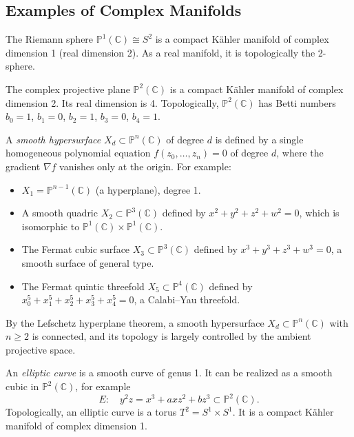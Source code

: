 \subsection{Examples of Complex Manifolds}

\begin{example}
The Riemann sphere $\mathbb{P}^1(\mathbb{C}) \cong S^2$ is a compact K\"{a}hler manifold of complex dimension 1 (real dimension 2). As a real manifold, it is topologically the 2-sphere.
\end{example}

\begin{example}
The complex projective plane $\mathbb{P}^2(\mathbb{C})$ is a compact K\"{a}hler manifold of complex dimension 2. Its real dimension is 4. Topologically, $\mathbb{P}^2(\mathbb{C})$ has Betti numbers $b_0 = 1$, $b_1 = 0$, $b_2 = 1$, $b_3 = 0$, $b_4 = 1$.
\end{example}

\begin{example}
A \emph{smooth hypersurface} $X_d \subset \mathbb{P}^n(\mathbb{C})$ of degree $d$ is defined by a single homogeneous polynomial equation $f(z_0, \ldots, z_n) = 0$ of degree $d$, where the gradient $\nabla f$ vanishes only at the origin. For example:
\begin{itemize}
\item $X_1 = \mathbb{P}^{n-1}(\mathbb{C})$ (a hyperplane), degree 1.
\item A smooth quadric $X_2 \subset \mathbb{P}^3(\mathbb{C})$ defined by $x^2 + y^2 + z^2 + w^2 = 0$, which is isomorphic to $\mathbb{P}^1(\mathbb{C}) \times \mathbb{P}^1(\mathbb{C})$.
\item The Fermat cubic surface $X_3 \subset \mathbb{P}^3(\mathbb{C})$ defined by $x^3 + y^3 + z^3 + w^3 = 0$, a smooth surface of general type.
\item The Fermat quintic threefold $X_5 \subset \mathbb{P}^4(\mathbb{C})$ defined by $x_0^5 + x_1^5 + x_2^5 + x_3^5 + x_4^5 = 0$, a Calabi--Yau threefold.
\end{itemize}
By the Lefschetz hyperplane theorem, a smooth hypersurface $X_d \subset \mathbb{P}^n(\mathbb{C})$ with $n \ge 2$ is connected, and its topology is largely controlled by the ambient projective space.
\end{example}

\begin{example}
An \emph{elliptic curve} is a smooth curve of genus 1. It can be realized as a smooth cubic in $\mathbb{P}^2(\mathbb{C})$, for example
\[
E: \quad y^2 z = x^3 + axz^2 + bz^3 \subset \mathbb{P}^2(\mathbb{C}).
\]
Topologically, an elliptic curve is a torus $T^2 = S^1 \times S^1$. It is a compact K\"{a}hler manifold of complex dimension 1.
\end{example}

